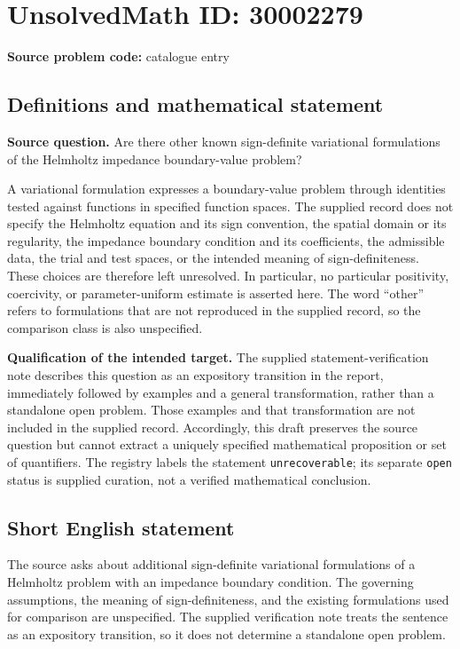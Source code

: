 \documentclass[11pt]{article}
\begin{document}
\section*{UnsolvedMath ID: 30002279}
\textbf{Source problem code:} catalogue entry
\subsection{Definitions and mathematical statement}
\textbf{Source question.} Are there other known sign-definite variational formulations of the Helmholtz impedance boundary-value problem?

A variational formulation expresses a boundary-value problem through identities tested against functions in specified function spaces. The supplied record does not specify the Helmholtz equation and its sign convention, the spatial domain or its regularity, the impedance boundary condition and its coefficients, the admissible data, the trial and test spaces, or the intended meaning of sign-definiteness. These choices are therefore left unresolved. In particular, no particular positivity, coercivity, or parameter-uniform estimate is asserted here. The word ``other'' refers to formulations that are not reproduced in the supplied record, so the comparison class is also unspecified.

\textbf{Qualification of the intended target.} The supplied statement-verification note describes this question as an expository transition in the report, immediately followed by examples and a general transformation, rather than a standalone open problem. Those examples and that transformation are not included in the supplied record. Accordingly, this draft preserves the source question but cannot extract a uniquely specified mathematical proposition or set of quantifiers. The registry labels the statement \texttt{unrecoverable}; its separate \texttt{open} status is supplied curation, not a verified mathematical conclusion.
\subsection{Short English statement}
The source asks about additional sign-definite variational formulations of a Helmholtz problem with an impedance boundary condition. The governing assumptions, the meaning of sign-definiteness, and the existing formulations used for comparison are unspecified. The supplied verification note treats the sentence as an expository transition, so it does not determine a standalone open problem.
\end{document}
